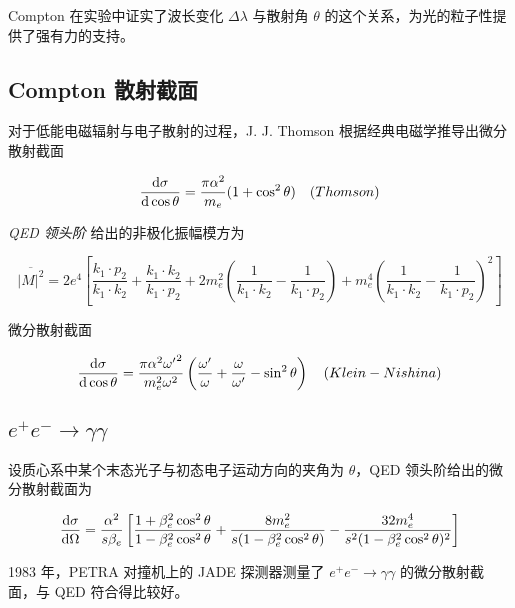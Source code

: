 Compton 在实验中证实了波长变化 $\Delta\lambda$ 与散射角 $\theta$ 的这个关系，为光的粒子性提供了强有力的支持。

\subsection{Compton 散射截面}

对于低能电磁辐射与电子散射的过程，J. J. Thomson 根据经典电磁学推导出微分散射截面

\begin{equation}
    \frac{\mathop{}\!\mathrm{d}\sigma}{\mathop{}\!\mathrm{d}\cos\theta} = \frac{\pi \alpha^2}{m_e} (1+\cos^2 \theta) \quad (Thomson)
\end{equation}

\emph{QED 领头阶} 给出的非极化振幅模方为

\begin{equation}
    \overline{|M|^2} = 2 e^4 \left[\frac{k_1 \cdot p_2}{k_1 \cdot k_2} + \frac{k_1 \cdot k_2}{k_1 \cdot p_2} + 2 m_e^2 \left(\frac{1}{k_1 \cdot k_2} - \frac{1}{k_1 \cdot p_2}\right) + m_e^4 \left(\frac{1}{k_1 \cdot k_2} - \frac{1}{k_1 \cdot p_2}\right)^2\right]
\end{equation}

微分散射截面

\begin{equation}
    \frac{\mathop{}\!\mathrm{d}\sigma}{\mathop{}\!\mathrm{d}\cos\theta} = \frac{\pi \alpha^2 {\omega^\prime}^2}{m_e^2 \omega^2} \left(\frac{\omega^\prime}{\omega} + \frac{\omega}{\omega^\prime} - \sin^2 \theta\right) \quad (Klein-Nishina)
\end{equation}

\subsection{\texorpdfstring{$e^+ e^- \to \gamma\gamma$}{e+e- -> gamma gamma}}

设质心系中某个末态光子与初态电子运动方向的夹角为 $\theta$，QED 领头阶给出的微分散射截面为

\begin{equation}
    \frac{\mathop{}\!\mathrm{d}\sigma}{\mathop{}\!\mathrm{d}\Omega} = \frac{\alpha^2}{s \beta_e} \left[\frac{1 + \beta_e^2 \cos^2 \theta}{1 - \beta_e^2 \cos^2 \theta} + \frac{8 m_e^2}{s(1 - \beta_e^2 \cos^2 \theta)} - \frac{32 m_e^4}{s^2(1 - \beta_e^2 \cos^2 \theta)^2}\right]
\end{equation}

1983 年，PETRA 对撞机上的 JADE 探测器测量了 $e^+ e^- \to \gamma\gamma$ 的微分散射截面，与 QED 符合得比较好。

